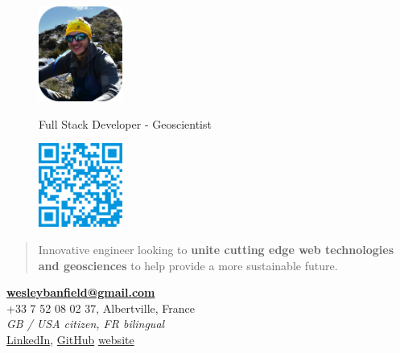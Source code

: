 \documentclass[]{friggeri-cv}
\begin{document}
\begin{figure}[!h]
	\begin{minipage}{0.48\textwidth}
		\begin{flushleft}
			\includegraphics[width=2.75cm]{img/profile_relaxed.png}
		\end{flushleft}
	\end{minipage}\hfill
 	{Full Stack Developer - Geoscientist}
	\begin{minipage}{0.48\textwidth}
		\begin{flushright}
			\includegraphics[width=2.75cm]{img/qrcode.png}
		\end{flushright}
	\end{minipage}
\end{figure}
\vspace{-0.75cm}

\begin{quote}
\large
\begin{center}
Innovative engineer looking to \textbf{unite cutting edge web technologies and geosciences} to help provide a more sustainable future.
\\
\end{center}
\end{quote}

\begin{center}
\vspace{6pt}
\href{mailto:wesleybanfield@gmail.com}{\textbf{wesleybanfield@gmail.com}}
\\+33 7 52 08 02 37, Albertville, France
\\\emph{GB / USA citizen, FR bilingual}
\vspace{3pt}
\\\href{https://www.linkedin.com/in/wesleybanfield/}{LinkedIn},
\href{https://github.com/WesleyTheGeolien}{GitHub}
\href{https://wesleythegeolien.github.io}{website}
\end{center}
\end{document}

